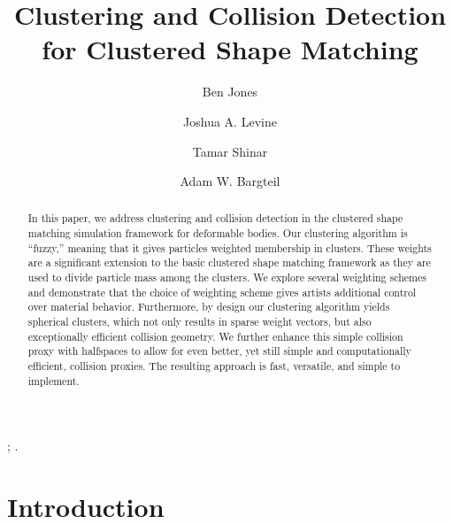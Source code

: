 \documentclass[review]{acmsiggraph}
\title{Clustering and Collision Detection for Clustered Shape Matching}
\author[*]{Ben Jones}
\author[**]{Joshua A. Levine}
\author[***]{Tamar Shinar}
\author[*]{Adam W. Bargteil}
\affil[*]{University of Utah}
\affil[**]{Clemson University}
\affil[***]{University of California, Riverside}
\begin{document}


\maketitle

\begin{abstract}
In this paper, we address clustering and collision detection in the clustered shape matching simulation framework
for deformable bodies.  Our clustering algorithm is ``fuzzy,'' meaning that it gives particles weighted membership in clusters.
These weights are a significant extension to the basic clustered shape matching framework as they
are used to divide particle mass among the clusters.  We explore several weighting schemes
and demonstrate that the choice of weighting scheme gives artists additional control over material behavior.
Furthermore, by design our clustering algorithm yields spherical clusters, which not only results in sparse weight vectors, but
also exceptionally efficient collision geometry.  We further 
enhance this simple collision proxy with halfspaces to allow for even better, yet still simple and computationally efficient, 
collision proxies.  The resulting approach is fast, versatile, and simple to implement.
\end{abstract}

\begin{CRcatlist}
  ;
  .
\end{CRcatlist}

\keywordlist


\copyrightspace

\section{Introduction}\label{sec:Introduction}
\end{document}

